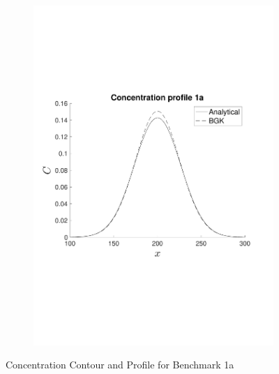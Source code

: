 \documentclass[11pt]{article}   	%
\begin{document}
\begin{figure}
\begin{subfigure}{0.5\textwidth}
  \centering
  \includegraphics[width=1.2\linewidth]{concentration_profile_benchmark_1a}
\end{subfigure}
\caption{Concentration Contour and Profile for Benchmark 1a}
\label{fig:test}
\end{figure}
\end{document}
